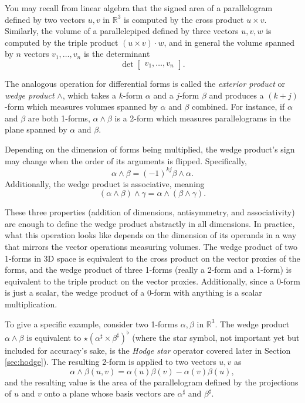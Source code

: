 \documentclass[utf8,english]{gradu3}
\begin{document}
You may recall from linear algebra that the signed area of a parallelogram
defined by two vectors $u,v$ in $\mathbb{R}^3$ is computed
by the cross product $u \times v$.
Similarly, the volume of a parallelepiped defined by three vectors $u,v,w$
is computed by the triple product $(u \times v) \cdot w$,
and in general the volume spanned by $n$ vectors $v_1, \dots, v_n$
is the determinant
\[
  \det \begin{bmatrix}
    v_1, \dots, v_n
  \end{bmatrix}.
\]

The analogous operation for differential forms is called the
\textit{exterior product} or \textit{wedge product} $\wedge$,
which takes a $k$-form $\alpha$ and a $j$-form $\beta$
and produces a $(k+j)$-form which measures volumes spanned by
$\alpha$ and $\beta$ combined.
For instance, if $\alpha$ and $\beta$ are both 1-forms,
$\alpha \wedge \beta$ is a 2-form which measures parallelograms
in the plane spanned by $\alpha$ and $\beta$.

Depending on the dimension of forms being multiplied,
the wedge product's sign may change
when the order of its arguments is flipped. Specifically,
\begin{equation}\label{eq:wedge_antisymmetry}
  \alpha \wedge \beta = (-1)^{kj} \beta \wedge \alpha.
\end{equation}
Additionally, the wedge product is associative, meaning
\begin{equation}
  (\alpha \wedge \beta) \wedge \gamma = \alpha \wedge (\beta \wedge \gamma).
\end{equation}

These three properties (addition of dimensions, antisymmetry, and associativity)
are enough to define the wedge product abstractly in all dimensions.
In practice, what this operation looks like depends on the dimension of its operands
in a way that mirrors the vector operations measuring volumes.
The wedge product of two 1-forms in 3D space
is equivalent to the cross product on the vector proxies of the forms,
and the wedge product of three 1-forms (really a 2-form and a 1-form)
is equivalent to the triple product on the vector proxies.
Additionally, since a 0-form is just a scalar,
the wedge product of a 0-form with anything is a scalar multiplication.

To give a specific example, consider two 1-forms $\alpha, \beta$ in $\mathbb{R}^3$.
The wedge product $\alpha \wedge \beta$
is equivalent to $\star(\alpha^{\sharp} \times \beta^{\sharp})^{\flat}$
(where the star symbol, not important yet but included for accuracy's sake,
is the \textit{Hodge star} operator covered later in Section \ref{sec:hodge}).
The resulting 2-form is applied to two vectors $u,v$ as
\[
  \alpha \wedge \beta (u,v) = \alpha(u)\beta(v) - \alpha(v)\beta(u),
\]
and the resulting value is the area of the parallelogram
defined by the projections of $u$ and $v$
onto a plane whose basis vectors are $\alpha^{\sharp}$ and $\beta^{\sharp}$.
\end{document}

